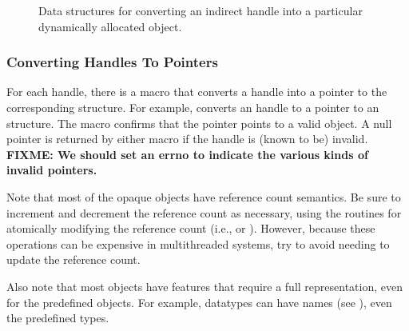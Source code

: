 \documentclass{article}
\def\fixme#1{\marginpar{FIXME:}\textbf{FIXME: #1}}
\begin{document}
\begin{figure}
\centerline{}
\caption{Data structures for converting an indirect handle into a particular
  dynamically allocated object.}
\label{fig:indirect}
\end{figure}

\subsubsection{Converting Handles To Pointers}
\label{sec:handle-to-ptr}
For each handle, there is a macro  that converts a
handle into a pointer to the corresponding structure.  For example,
 converts an  handle to a
pointer to an
 structure.  The macro  confirms
that the pointer points to a valid object.
A null pointer is returned by either macro if the handle
is (known to be) invalid.
\fixme{We should set an errno to indicate the various kinds of invalid pointers.}

Note that most of the opaque objects have reference count semantics.
Be sure to increment and decrement the reference count as necessary,
using the routines for atomically modifying the reference count (i.e.,
 or ).
However, because these operations can be expensive in multithreaded
systems, try to avoid needing to update the reference count.


Also note that most objects have features that require a full
representation, even for the predefined objects.  For example,
datatypes can have names (see ), even the
predefined types.
\end{document}
